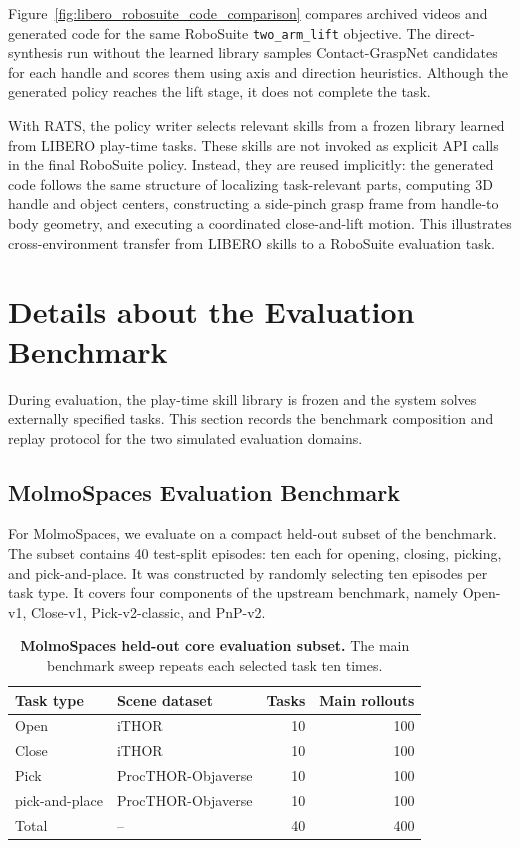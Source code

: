 \documentclass{llmxive}
\begin{document}
Figure~\ref{fig:libero_robosuite_code_comparison} compares archived videos and generated code for the same RoboSuite \texttt{two\_arm\_lift} objective. The direct-synthesis run without the learned library samples Contact-GraspNet candidates for each handle and scores them using axis and direction heuristics. Although the generated policy reaches the lift stage, it does not complete the task.

With RATS, the policy writer selects relevant skills from a frozen library learned from LIBERO play-time tasks. These skills are not invoked as explicit API calls in the final RoboSuite policy. Instead, they are reused implicitly: the generated code follows the same structure of localizing task-relevant parts, computing 3D handle and object centers, constructing a side-pinch grasp frame from handle-to body geometry, and executing a coordinated close-and-lift motion. This illustrates cross-environment transfer from LIBERO skills to a RoboSuite evaluation task.

\section{Details about the Evaluation Benchmark}
\label{sec:appendix_evaluation_benchmarks}

During evaluation, the play-time skill library is frozen and the system solves
externally specified tasks. This section records the benchmark composition and
replay protocol for the two simulated evaluation domains.

\subsection{MolmoSpaces Evaluation Benchmark}
\label{sec:appendix_molmospaces_benchmark}

For MolmoSpaces, we evaluate on a compact held-out subset of the
benchmark. The subset contains
40 test-split episodes: ten each for opening, closing, picking, and
pick-and-place. It was constructed by randomly selecting ten
episodes per task type. It covers four components of the upstream
benchmark, namely Open-v1, Close-v1, Pick-v2-classic, and PnP-v2.

\begin{table}[t]
\centering
\begin{tabular}{llrr}
\toprule
\textbf{Task type} & \textbf{Scene dataset} & \textbf{Tasks} & \textbf{Main rollouts} \\
\midrule
Open & iTHOR & 10 & 100 \\
Close & iTHOR & 10 & 100 \\
Pick & ProcTHOR-Objaverse & 10 & 100 \\
pick-and-place & ProcTHOR-Objaverse & 10 & 100 \\
\midrule
Total & -- & 40 & 400 \\
\bottomrule
\end{tabular}

\caption{
\textbf{MolmoSpaces held-out core evaluation subset.}
The main benchmark sweep repeats each selected task ten times.
}
\label{tab:molmospaces_eval_benchmark}
\end{table}
\end{document}
